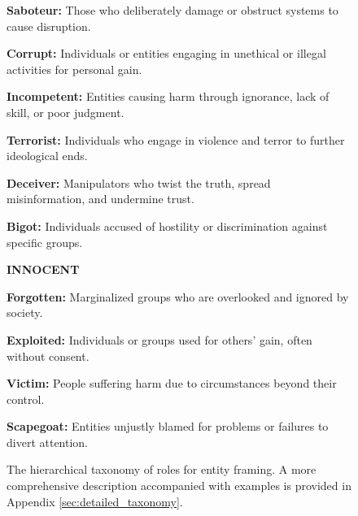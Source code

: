 \begin{figure}[!ht]
\begin{tcolorbox}
\noindent\textbf{Saboteur:} Those who deliberately damage or obstruct systems to cause disruption.

\noindent\textbf{Corrupt:} Individuals or entities engaging in unethical or illegal activities for personal gain.

\noindent\textbf{Incompetent:} Entities causing harm through ignorance, lack of skill, or poor judgment.

\noindent\textbf{Terrorist:} Individuals who engage in violence and terror to further ideological ends.

\noindent\textbf{Deceiver:} Manipulators who twist the truth, spread misinformation, and undermine trust.

\noindent\textbf{Bigot:} Individuals accused of hostility or discrimination against specific groups.

\medskip

\noindent\textbf{INNOCENT}

\medskip

\noindent\textbf{Forgotten:} Marginalized groups who are overlooked and ignored by society.

\noindent\textbf{Exploited:} Individuals or groups used for others’ gain, often without consent.

\noindent\textbf{Victim:} People suffering harm due to circumstances beyond their control.

\noindent\textbf{Scapegoat:} Entities unjustly blamed for problems or failures to divert attention.
\end{tcolorbox}

    \caption{The hierarchical taxonomy of roles for entity framing. A more comprehensive description accompanied with examples is provided in Appendix \ref{sec:detailed_taxonomy}.}
    \label{fig:taxonomy_roles}
\end{figure}



